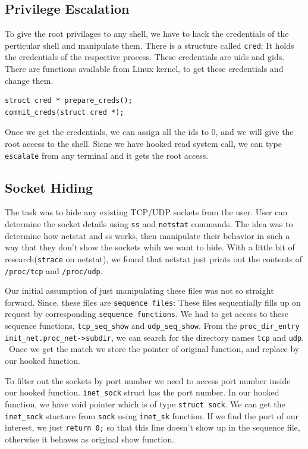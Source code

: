 \documentclass[10pt, letterpaper]{scrartcl}
\begin{document}
\subsection{Privilege Escalation}
To give the root privilages to any shell, we have to hack the credentials of the perticular shell and 
manipulate them. There is a structure called \texttt{cred}: 
It holds the credentials of the respective process. These credentials are uids and gids. 
There are functions available from Linux kernel, to get these credentials and change them. 

\begin{verbatim}
struct cred * prepare_creds();
commit_creds(struct cred *);
\end{verbatim}

Once we get the credentials, we can assign all the ids to 0, and we will give the root access to the shell. 
Sicne we have hooked read system call, 
we can type \texttt{escalate} from any terminal and it gets the root access. 

\subsection{Socket Hiding}
The task was to hide any existing TCP/UDP sockets from the user. 
User can determine the socket details using \texttt{ss} and \texttt{netstat} commands.
The idea was to determine how netstat and ss works, 
then manipulate their behavior in such a way that they don't show the sockets whih we want to hide. 
With a little bit of research(\texttt{strace} on netstat), 
we found that netstat just prints out the contents of \texttt{/proc/tcp} and \texttt{/proc/udp}.

Our initial assumption of just manipulating these files was not so straight forward. 
Since, these files are \texttt{sequence files}: 
These files sequentially fills up on request by corresponding \texttt{sequence functions}. 
We had to get access to these sequence functions, \texttt{tcp\_seq\_show} and \texttt{udp\_seq\_show}. 
From the \texttt{proc\_dir\_entry} \texttt{init\_net.proc\_net->subdir}, 
we can search for the directory names \texttt{tcp} and \texttt{udp}. \
Once we get the match we store the pointer of original function, and replace by our hooked function. 

To filter out the sockets by port number we need to access port number inside our hooked function. 
\texttt{inet\_sock} struct has the port number. 
In our hooked function, we have void pointer which is of type \texttt{struct sock}. 
We can get the \texttt{inet\_sock} stucture from \texttt{sock} using \texttt{inet\_sk} function. 
If we find the port of our interest, we just \texttt{return 0;} so that this line doesn't show up in the 
sequence file, otherwise it behaves as original show function. 
\end{document}
